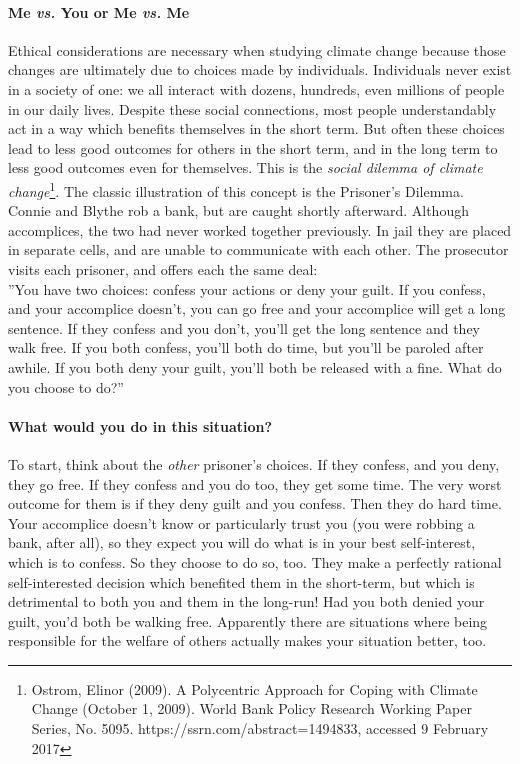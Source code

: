 \documentclass[amstex,12pt]{book}
\begin{document}
\paragraph{Me \textit{vs.} You or Me \textit{vs.} Me}
Ethical considerations are necessary when studying climate change because those changes are ultimately due to choices made by individuals. Individuals never exist in a society of one: we all interact with dozens, hundreds, even millions of people in our daily lives. Despite these social connections, most people understandably act in a way which benefits themselves in the short term. But often these choices lead to less good outcomes for others in the short term, and in the long term to less good outcomes even for themselves. This is the \emph{social dilemma of climate change}\footnote{Ostrom, Elinor (2009). A Polycentric Approach for Coping with Climate Change (October 1, 2009). World Bank Policy Research Working Paper Series, No. 5095. https://ssrn.com/abstract=1494833, accessed 9 February 2017}. The classic illustration of this concept is the Prisoner's Dilemma.\\

Connie and Blythe rob a bank, but are caught shortly afterward. Although accomplices, the two had never worked together previously. In jail they are placed in separate cells, and are unable to communicate with each other. The prosecutor visits each prisoner, and offers each the same deal:\\

''You have two choices: confess your actions or deny your guilt. If you confess, and your accomplice doesn't, you can go free and your accomplice will get a long sentence. If they confess and you don't, you'll get the long sentence and they walk free. If you both confess, you'll both do time, but you'll be paroled after awhile. If you both deny your guilt, you'll both be released with a fine. What do you choose to do?''\\

\paragraph{What would you do in this situation?} To start, think about the \emph{other} prisoner's choices. If they confess, and you deny, they go free. If they confess and you do too, they get some time. The very worst outcome for them is if they deny guilt and you confess. Then they do hard time. Your accomplice doesn't know or particularly trust you (you were robbing a bank, after all), so they expect you will do what is in your best self-interest, which is to confess. So they choose to do so, too. They make a perfectly rational self-interested decision which benefited them in the short-term, but which is detrimental to both you and them in the long-run! Had you both denied your guilt, you'd both be walking free. Apparently there are situations where being responsible for the welfare of others actually makes your situation better, too.\\
\end{document}
